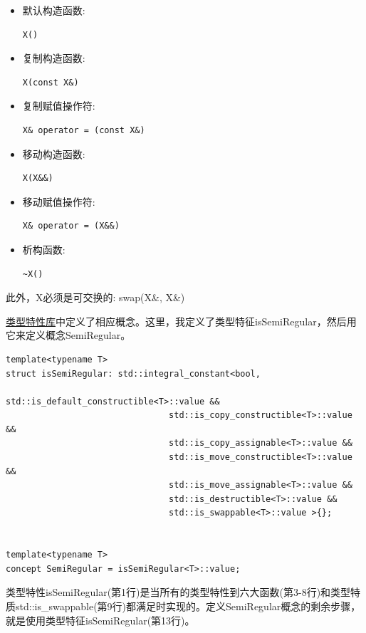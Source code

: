 \begin{itemize}
\item
默认构造函数:
\begin{lstlisting}[style=styleCXX]
X()
\end{lstlisting}

\item
复制构造函数:
\begin{lstlisting}[style=styleCXX]
X(const X&)
\end{lstlisting}

\item
复制赋值操作符:
\begin{lstlisting}[style=styleCXX]
X& operator = (const X&)
\end{lstlisting}

\item
移动构造函数:
\begin{lstlisting}[style=styleCXX]
X(X&&)
\end{lstlisting}

\item
移动赋值操作符:
\begin{lstlisting}[style=styleCXX]
X& operator = (X&&)
\end{lstlisting}

\item
析构函数:
\begin{lstlisting}[style=styleCXX]
~X()
\end{lstlisting}
\end{itemize}

此外，X必须是可交换的: swap(X\&, X\&)

\href{https://en.cppreference.com/w/cpp/header/type_traits}{类型特性库}中定义了相应概念。这里，我定义了类型特征isSemiRegular，然后用它来定义概念SemiRegular。

\begin{lstlisting}[style=styleCXX]
template<typename T>
struct isSemiRegular: std::integral_constant<bool,
								std::is_default_constructible<T>::value &&
								std::is_copy_constructible<T>::value &&
								std::is_copy_assignable<T>::value &&
								std::is_move_constructible<T>::value &&
								std::is_move_assignable<T>::value &&
								std::is_destructible<T>::value &&
								std::is_swappable<T>::value >{};


template<typename T>
concept SemiRegular = isSemiRegular<T>::value;
\end{lstlisting}

类型特性isSemiRegular(第1行)是当所有的类型特性到六大函数(第3-8行)和类型特质std::is\_swappable(第9行)都满足时实现的。定义SemiRegular概念的剩余步骤，就是使用类型特征isSemiRegular(第13行)。

